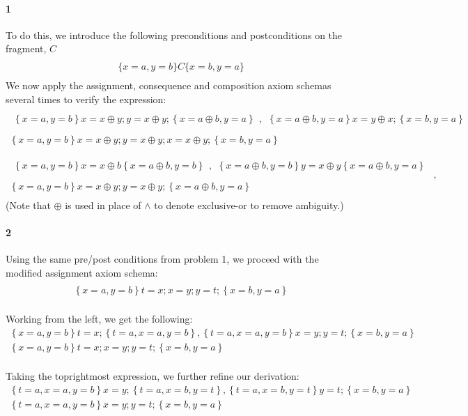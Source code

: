 \documentclass{article}
\begin{document}
\newcommand{\hpl}[3]{ \left \{ #1 \right \} #2 \left \{ #3 \right \} }
\newcommand{\derive}[2]{\begin{array}{c} #1 \\ \hline #2 \\ \end{array} }
\renewcommand{\and}{,}

\paragraph{1}
To do this, we introduce the following preconditions and postconditions on the fragment, $C$
\[ \derive{}{\{ x = a \and y = b \} C \{ x = b \and y = a \}} \]
We now apply the assignment, consequence and composition axiom schemas several times to verify the expression:
\begin{equation*}
\derive{
 \derive{}{
	\hpl{x = a \and y = b}{x = x \oplus y; y = x \oplus y ;}{x = a \oplus b \and y = a}} \and
 \derive{}{
 	\hpl{x = a \oplus b \and y = a}{x = y \oplus x ;}{x = b  \and y = a }}}{ 
 \hpl{x = a \and y = b}{x = x \oplus y; y = x \oplus y ; x = x \oplus y ;}{x = b \and y = a} }
\end{equation*}
\[
 \derive{
 	\derive{}{
 	  \hpl{x = a \and y = b}{x = x \oplus b}{x = a \oplus b \and y = b}} \and
 	\derive{}{
 	  \hpl{x = a \oplus b \and y = b}{y = x \oplus y}{x = a \oplus b \and y = a}}
 	}{
	\hpl{x = a \and y = b}{x = x \oplus y; y = x \oplus y ;}{x = a \oplus b \and y = a}} \and
\]
(Note that $\oplus$ is used in place of $\wedge$ to denote exclusive-or to remove ambiguity.)

\paragraph{2}
Using the same pre/post conditions from problem 1, we proceed with the modified assignment axiom schema:
\begin{equation*}
\derive{}
{ \hpl{x = a \and y = b}{t = x; x = y; y = t;}{x = b \and y = a} }
\end{equation*}

Working from the left, we get the following:
\begin{equation*}
\derive{ \hpl{x = a \and y = b}{ t = x; }{ t = a \and x = a \and y = b } \and
\hpl{t = a \and x = a \and y = b}{ x = y ; y = t ; }{ x = b \and  y = a }
}
{ \hpl{x = a \and y = b}{t = x; x = y; y = t;}{x = b \and y = a} }
\end{equation*}

Taking the toprightmost expression, we further refine our derivation:
\begin{equation*}
\derive{
\hpl{t=a \and x=a \and y=b}{x = y;}{t = a \and x = b \and y = t} \and
\hpl{t = a \and x = b \and y = t}{y = t; }{x = b \and y = a}
}
{\hpl{t = a \and x = a \and y = b}{ x = y ; y = t ; }{ x = b \and  y = a }}
\end{equation*}
\end{document}
